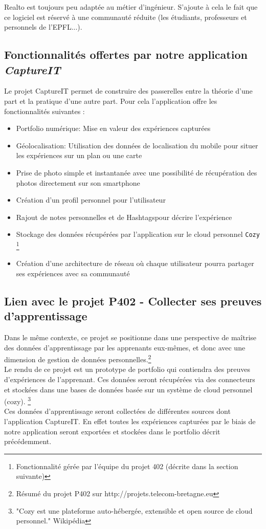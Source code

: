 \documentclass{report}
\begin{document}
Realto est toujours peu adaptée au métier d'ingénieur. S'ajoute à cela le fait que ce logiciel est réservé à une communauté réduite (les étudiants, professeurs et personnels de l'EPFL...).

\subsection{Fonctionnalités offertes par notre application \emph{CaptureIT}}

Le projet CaptureIT permet de construire des passerelles entre la théorie d'une part et la pratique d'une autre part. Pour cela l'application offre les fonctionnalités suivantes :

\begin{itemize}
    \item Portfolio numérique: Mise en valeur des expériences capturées
    \item Géolocalisation: Utilisation des données de localisation du mobile pour situer les expériences sur un plan ou une carte
    \item Prise de photo simple et instantanée avec une possibilité de récupération des photos directement sur son smartphone
    \item Création d'un profil personnel pour l'utilisateur
    \item Rajout de notes personnelles et de  \og Hashtags\fg  pour décrire l'expérience
    \item Stockage des données récupérées par l'application sur le cloud personnel \texttt{Cozy} \footnote{Fonctionnalité gérée par l'équipe du projet 402 (décrite dans la section suivante)}
    \item Création d'une architecture de réseau où chaque utilisateur pourra partager ses expériences avec sa \og communauté \fg
    
\end{itemize}

\subsection{Lien avec le projet P402 - Collecter ses preuves d’apprentissage}
Dans le même contexte, \og ce projet se positionne dans une perspective de maîtrise des données d'apprentissage par les apprenants eux-mêmes, et donc avec
une dimension de gestion de données personnelles.\fg \footnote{Résumé du projet P402 sur http://projets.telecom-bretagne.eu }\\
Le rendu de ce projet est un prototype de portfolio qui contiendra des preuves d'expériences de l'apprenant. Ces données seront récupérées via des connecteurs et stockées dans une bases de données basée sur un système de cloud personnel (cozy). \footnote{"Cozy est une plateforme auto-hébergée, extensible et open source de cloud personnel." Wikipédia}\\
Ces données d'apprentissage seront collectées de différentes sources dont l'application CaptureIT. En effet toutes les expériences capturées par le biais de notre application seront exportées et stockées dans le portfolio décrit précédemment. 
\end{document}
